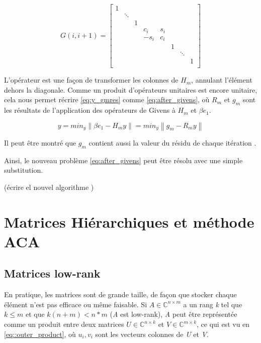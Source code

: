 \documentclass[a4paper, 15pt]{report}
\newcommand{\norm}[1]{\left\lVert#1\right\rVert}
\begin{document}
    \begin{equation}\label{eq:givens}
    G(i,i+1)=
    \begin{bmatrix}
            1 & & & & & & & \\
             &\ddots & & & & & & \\
             & & 1 & & & & & \\
              & & & c_{i}& s_{i} & & & \\
            & & & -s_{i}& c_{i} & & & \\
            & & & & & 1& & \\
            & & & & & & \ddots& \\
            & & & & & & & 1\\
    \end{bmatrix}
    \end{equation}

    L'opérateur est une façon de transformer les colonnes de $H_{m}$, annulant l'élément dehors la diagonale. Comme un produit d'opérateurs unitaires est encore unitaire, cela nous permet récrire \ref{eq:y_gmres} comme \ref{eq:after_givens}, où $R_{m}$ et $g_{m}$ sont les résultats de l'application des opérateurs de Givens à $H_{m}$ et $\beta e_{1}$.

    \begin{equation}\label{eq:after_givens}
        y = min_{y} \norm{\beta e_{1} - H_{m}y} = min_{y} \norm{g_{m} - R_{m}y}
    \end{equation}

    Il peut être montré que $g_{m}$ contient aussi la valeur du résidu de chaque itération \cite{saad2003iterative}.

    Ainsi, le nouveau problème \ref{eq:after_givens} peut être résolu avec une simple substitution.

    (écrire el nouvel algorithme )

    \chapter{Matrices Hiérarchiques et méthode ACA}

    \section{Matrices low-rank}
    
    En pratique, les matrices sont de grande taille, de façon que stocker chaque élément n'est pas efficace ou même faisable.  Si $A \in \mathbb{C}^{n\times m}$ a un rang \textit{k} tel que $k \leq m$ et que $k(n+m) < n*m$ (\textit{A} est low-rank), \textit{A} peut être représentée comme un produit entre deux matrices $U \in \mathbb{C}^{n\times k} $ et $V \in \mathbb{C}^{m\times k}$, ce qui est vu en \ref{eq::outer_product}, où $u_{i}, v_{i}$ sont les vecteurs colonnes de \textit{U} et \textit{V}.
\end{document}
